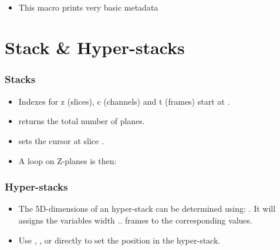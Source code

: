 \begin{frame}
  \begin{example}~\par
    \begin{itemize}
    \item This macro prints very basic metadata
      
    \end{itemize}
  \end{example}
\end{frame}

\section{Stack \& Hyper-stacks}
\begin{frame}[fragile]
  \frametitle<presentation>{Stacks}
  \begin{itemize}
  \item Indexes for z (slices), c (channels) and t (frames) start at .
  \item {} returns the total number of planes.
  \item {} sets the cursor at slice .
  \item A loop on Z-planes is then:\par
    
  \end{itemize}
\end{frame}

\begin{frame}
  \frametitle<presentation>{Hyper-stacks}
  \begin{itemize}
  \item The 5D-dimensions of an hyper-stack can be determined using:
    . It
    will assigns the variables width .. frames to the corresponding
    values.
  \item Use , ,
     or directly
     to set the position in the
    hyper-stack.
  \end{itemize}
\end{frame}


